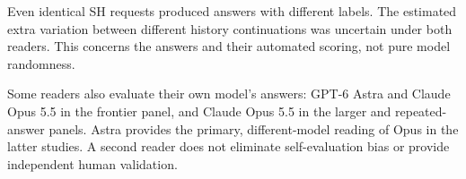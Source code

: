 Even identical SH requests produced answers with different labels.
The estimated extra variation between different history
continuations was uncertain under both readers. This concerns the
answers and their automated scoring, not pure model randomness.

Some readers also evaluate their own model's answers: GPT-6 Astra and
Claude Opus 5.5 in the frontier panel, and Claude Opus 5.5 in the larger
and repeated-answer panels. Astra provides the primary, different-model
reading of Opus in the latter studies. A second reader does not eliminate
self-evaluation bias or provide independent human validation.
